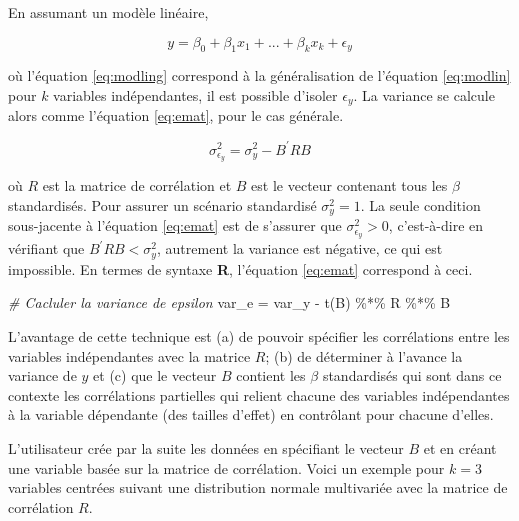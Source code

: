 \documentclass[
]{book}
\newenvironment{Shaded}{}{}
\newcommand{\CommentTok}[1]{\textit{#1}}
\newcommand{\FunctionTok}[1]{#1}
\newcommand{\NormalTok}[1]{#1}
\newcommand{\OtherTok}[1]{#1}
\newcommand{\SpecialCharTok}[1]{#1}
\begin{document}
En assumant un modèle linéaire,

\begin{equation}
y = \beta_0 + \beta_1 x_1 + ... +\beta_k x_k + \epsilon_y
\label{eq:modling}
\end{equation}

où l'équation \eqref{eq:modling} correspond à la généralisation de l'équation \eqref{eq:modlin} pour \(k\) variables indépendantes, il est possible d'isoler \(\epsilon_y\). La variance se calcule alors comme l'équation \eqref{eq:emat}, pour le cas générale.

\begin{equation}
\sigma^2_{\epsilon_y} = \sigma^2_y - B^{\prime}RB
\label{eq:emat}
\end{equation}

où \(R\) est la matrice de corrélation et \(B\) est le vecteur contenant tous les \(\beta\) standardisés. Pour assurer un scénario standardisé \(\sigma^2_y = 1\). La seule condition sous-jacente à l'équation \eqref{eq:emat} est de s'assurer que \(\sigma^2_{\epsilon_y} > 0\), c'est-à-dire en vérifiant que \(B^{\prime}RB < \sigma^2_y\), autrement la variance est négative, ce qui est impossible. En termes de syntaxe \textbf{R}, l'équation \eqref{eq:emat} correspond à ceci.

\begin{Shaded}
\begin{Highlighting}[]
\CommentTok{\# Cacluler la variance de epsilon}
\NormalTok{var\_e }\OtherTok{=}\NormalTok{ var\_y }\SpecialCharTok{{-}} \FunctionTok{t}\NormalTok{(B) }\SpecialCharTok{\%*\%}\NormalTok{ R }\SpecialCharTok{\%*\%}\NormalTok{ B}
\end{Highlighting}
\end{Shaded}

L'avantage de cette technique est (a) de pouvoir spécifier les corrélations entre les variables indépendantes avec la matrice \(R\); (b) de déterminer à l'avance la variance de \(y\) et (c) que le vecteur \(B\) contient les \(\beta\) standardisés qui sont dans ce contexte les corrélations partielles qui relient chacune des variables indépendantes à la variable dépendante (des tailles d'effet) en contrôlant pour chacune d'elles.

L'utilisateur crée par la suite les données en spécifiant le vecteur \(B\) et en créant une variable basée sur la matrice de corrélation. Voici un exemple pour \(k=3\) variables centrées suivant une distribution normale multivariée avec la matrice de corrélation \(R\).
\end{document}

